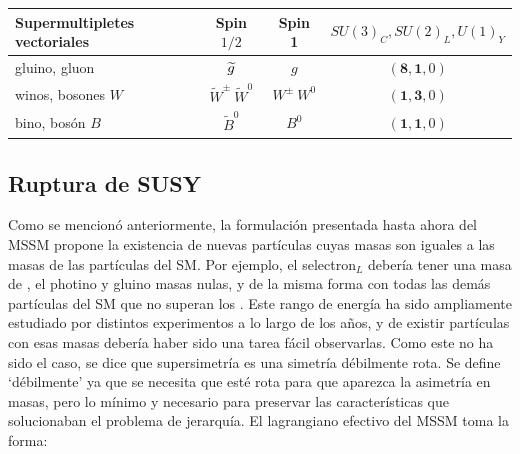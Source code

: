 \begin{table}
\begin{tabular}{ l c | c c c}
	\end{tabular}

	\vspace{0.5cm}

	\begin{tabular}{ l c | c c c}

		\hline
		\hline

		\multicolumn{2}{l|}{Supermultipletes vectoriales} & Spin $1/2$ & Spin 1 & $SU(3)_C, SU(2)_L, U(1)_Y$ \\

		\hline
		\hline

		\multicolumn{2}{l|}{gluino, gluon} & $\widetilde{g}$ & $g$ & $(\textbf{8}, \textbf{1}, 0)$ \\

		\hline

		\multicolumn{2}{l|}{winos, bosones $W$} & $\widetilde{W}^{\pm}\ \widetilde{W}^{0}$ & $W^{\pm}\ W^0$ & $(\textbf{1}, \textbf{3}, 0)$ \\

		\hline

		\multicolumn{2}{l|}{bino, bosón $B$} & $\widetilde{B}^0$ & $B^0$ & $(\textbf{1}, \textbf{1}, 0)$ \\

		\hline
		\hline

	\end{tabular}


	\label{tab:mssm_particles}

\end{table}


\subsection{Ruptura de SUSY}

Como se mencionó anteriormente, la formulación presentada hasta ahora del MSSM propone la existencia de nuevas partículas cuyas masas son iguales a las masas de las partículas del SM. Por ejemplo, el selectron$_L$ debería tener una masa de , el photino y gluino masas nulas, y de la misma forma con todas las demás partículas del SM que no superan los . Este rango de energía ha sido ampliamente estudiado por distintos experimentos a lo largo de los años, y de existir partículas con esas masas debería haber sido una tarea fácil observarlas. Como este no ha sido el caso, se dice que supersimetría es una simetría débilmente rota. Se define `débilmente' ya que se necesita que esté rota para que aparezca la asimetría en masas, pero lo mínimo y necesario para preservar las características que solucionaban el problema de jerarquía. El lagrangiano efectivo del MSSM toma la forma:

